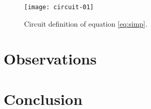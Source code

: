 \documentclass[12pt]{article}
\begin{document}
\begin{figure}[!hbtp]
\center
\texttt{[image: circuit-01]}
\caption{Circuit definition of equation \ref{eq:simp}.}
\label{fig:circuit}
\end{figure}



\clearpage

\section{Observations}


\clearpage
\section{Conclusion}



%
%
%
%

\end{document}
